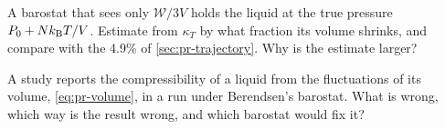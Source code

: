 \begin{exercise}
\label{ex:pr-dropped}
A barostat that sees only $\mathcal{W}/3V$ holds the liquid at the true
pressure $P_0 + Nk_{\mathrm{B}} T/V$. Estimate from $\kappa_T$ by what fraction its
volume shrinks, and compare with the 4.9\% of \cref{sec:pr-trajectory}.
Why is the estimate larger?
\end{exercise}

\begin{exercise}
\label{ex:pr-referee}
A study reports the compressibility of a liquid from the fluctuations of
its volume, \cref{eq:pr-volume}, in a run under Berendsen's barostat. What
is wrong, which way is the result wrong, and which barostat would fix
it?
\end{exercise}
